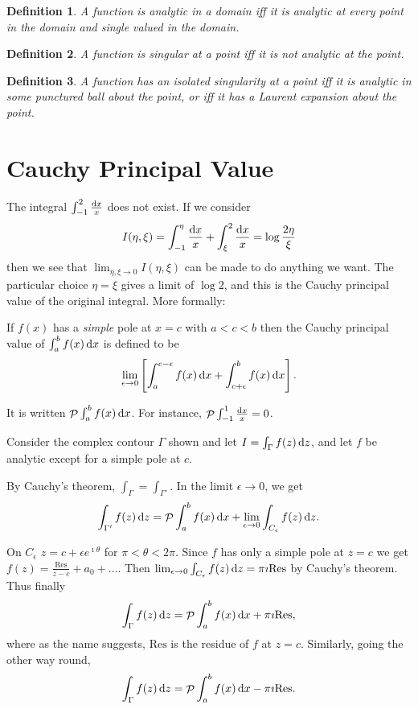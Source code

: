\documentclass{notes}
\DeclareMathOperator{\Pv}{\mathcal{P}}
\newcommand{\Res}{\mathrm{Res}}
\theoremstyle{plain}
\newtheorem*{definition}{Definition}
\begin{document}
\begin{definition}
A function is \emph{analytic} in a domain iff it is analytic at every
point in the domain and single valued in the domain.
\end{definition}

\begin{definition}
A function is \emph{singular} at a point iff it is not analytic at the point.
\end{definition}

\begin{definition}
A function has an \emph{isolated singularity} at a point iff it is analytic in
some punctured ball about the point, or iff it has a Laurent expansion about
the point.
\end{definition}

\section{Cauchy Principal Value}

The integral $\int_{-1}^2 \frac{\mathrm{d} x}{x}$ does not exist.  If we consider
\[
I(\eta,\xi) = \int_{-1}^\eta \frac{\mathrm{d} x}{x} + \int_\xi^2 \frac{\mathrm{d} x}{x}
= \log \frac{2 \eta}{\xi}
\]
then we see that $\lim_{\eta, \xi \to 0} I(\eta,\xi)$ can be made to
do anything we want.  The particular choice $\eta = \xi$ gives a limit
of $\log 2$, and this is the Cauchy principal value of the original integral.
More formally:

If $f(x)$ has a \emph{simple} pole at $x=c$ with $a < c < b$ then the
Cauchy principal value of $\int_a^b f(x)\, \mathrm{d} x$ is defined to be
\[
\lim_{\epsilon \to 0} \left[ 
\int_a^{c - \epsilon} f(x)\, \mathrm{d} x + \int_{c + \epsilon}^b f(x)\, \mathrm{d} x
\right].
\]

It is written $\Pv \int_a^b f(x)\, \ud x$.  For instance,
$\Pv \int_{-1}^1 \frac{\ud x}{x} = 0$.

\vspace{1in}

Consider the complex contour $\Gamma$ shown and let
$I = \int_\Gamma f(z)\, \mathrm{d} z$, and let $f$ be analytic except for a simple
pole at $c$.

By Cauchy's theorem, $\int_{\Gamma} = \int_{\Gamma'}$.  In the limit
$\epsilon \to 0$, we get
\[
\int_{\Gamma'} f(z)\, \ud z = \Pv \int_a^b f(x)\, \ud x
+ \lim_{\epsilon \to 0} \int_{C_\epsilon} f(z)\, \ud z.
\]

On $C_\epsilon$ $z = c + \epsilon e^{\imath \theta}$ for $\pi < \theta
< 2 \pi$.  Since $f$ has only a simple pole at $z=c$ we get $f(z) =
\frac{\Res}{z-c} + a_0 + \dots$.  Then $\lim_{\epsilon \to 0}
\int_{C_\epsilon} f(z)\, \ud z = \pi \imath \Res$ by Cauchy's theorem.
Thus finally
\[
\int_\Gamma f(z)\, \ud z = \Pv \int_a^b f(x)\, \ud x + \pi \imath \Res,
\]
where as the name suggests, $\Res$ is the residue of $f$ at $z=c$.  Similarly,
going the other way round,
\vspace{1in}
\[
\int_{\Gamma} f(z)\, \ud z = \Pv \int_a^b f(x)\, \ud x - \pi \imath \Res.
\]
\end{document}
